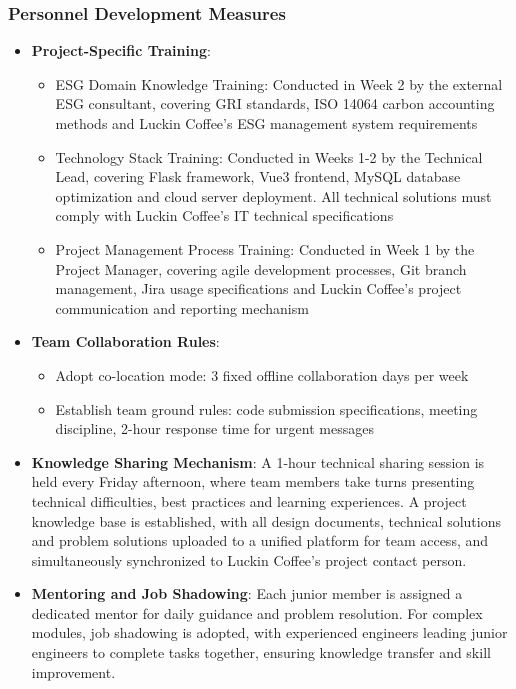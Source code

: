 \documentclass[12pt,a4paper]{article}
\begin{document}
\subsubsection{Personnel Development Measures}
\begin{itemize}
  \item \textbf{Project-Specific Training}:
  \begin{itemize}
    \item ESG Domain Knowledge Training: Conducted in Week 2 by the external ESG consultant, covering GRI standards, ISO 14064 carbon accounting methods and Luckin Coffee's ESG management system requirements
    \item Technology Stack Training: Conducted in Weeks 1-2 by the Technical Lead, covering Flask framework, Vue3 frontend, MySQL database optimization and cloud server deployment. All technical solutions must comply with Luckin Coffee's IT technical specifications
    \item Project Management Process Training: Conducted in Week 1 by the Project Manager, covering agile development processes, Git branch management, Jira usage specifications and Luckin Coffee's project communication and reporting mechanism
  \end{itemize}
  \item \textbf{Team Collaboration Rules}:
  \begin{itemize}
    \item Adopt co-location mode: 3 fixed offline collaboration days per week
    \item Establish team ground rules: code submission specifications, meeting discipline, 2-hour response time for urgent messages
  \end{itemize}
  \item \textbf{Knowledge Sharing Mechanism}: A 1-hour technical sharing session is held every Friday afternoon, where team members take turns presenting technical difficulties, best practices and learning experiences. A project knowledge base is established, with all design documents, technical solutions and problem solutions uploaded to a unified platform for team access, and simultaneously synchronized to Luckin Coffee's project contact person.
  \item \textbf{Mentoring and Job Shadowing}: Each junior member is assigned a dedicated mentor for daily guidance and problem resolution. For complex modules, job shadowing is adopted, with experienced engineers leading junior engineers to complete tasks together, ensuring knowledge transfer and skill improvement.

\end{itemize}
\end{document}

